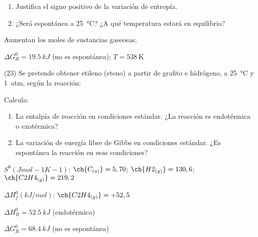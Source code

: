 \documentclass[10pt]{article}
\newenvironment{gexdatos}{
      \noindent\makebox[0pt][r]{\textit{Datos:}}
    }{\vspace{5pt}}
\begin{document}
\begin{multicols}{2}
\begin{exercise}[
    tags    = {},
    topics  = {química, termodinámica, termoquímica},
    source  = {FQ 1B MGH 2016, p181, e21},
  ]
  \begin{enumerate}
    \item Justifica el signo positivo de la variación de entropía.
    \item ¿Será espontánea a \SI{25}{\celsius}? ¿A qué temperatura estará en
    equilibrio?
  \end{enumerate}
\end{exercise}

\begin{solution}
  \begin{enumerate*}
    \item Aumentan los moles de sustancias gaseosas; \item \( \Delta G^0_R = \SI{19.5}{kJ} \) (no es espontánea); \( T = \SI{538}{\kelvin} \)
  \end{enumerate*}
\end{solution}




\begin{exercise}[
    tags    = {},
    topics  = {química, termodinámica, termoquímica},
    source  = {FQ 1B MGH 2016, p181, e23},
  ]
  (23) Se pretende obtener etileno (eteno) a partir de grafito e
  hidrógeno, a \SI{25}{\celsius} y \SI{1}{atm}, según la reacción:


  Calcula:

  \begin{enumerate}
    \item La entalpía de reacción en condiciones estándar. ¿La reacción es endotérmica o exotérmica?
    \item La variación de energía libre de Gibbs en condiciones
    estándar. ¿Es espontánea la reacción en esas condiciones?
  \end{enumerate}

  \begin{gexdatos}
    \( S^0 (J mol-1 K-1) \):
    \( \ch{C_{(s)}} = 5,70 \);
    \( \ch{H2_{(g)}} = 130,6 \);
    \( \ch{C2H4_{(g)}}= 219,2 \)

    \( \Delta H^0_f (\si{kJ/mol}) \):
    \( \ch{C2H4_{(g)}} = +52,5 \)
  \end{gexdatos}
\end{exercise}

\begin{solution}
  \begin{enumerate*}
    \item \( \Delta H^0_R = \SI{+52.5}{kJ} \) (endotérmica)
    \item \( \Delta G^0_R = \SI{+68.4}{kJ} \) (no es espontánea)
  \end{enumerate*}
\end{solution}







\end{multicols}
\end{document}
